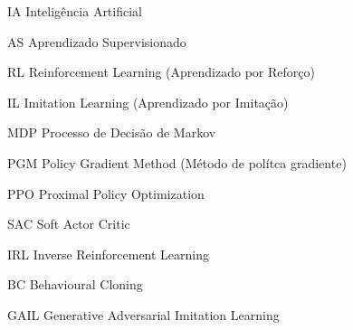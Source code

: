 \documentclass[
	12pt,					%
	openright,				%
	twoside,					%
	a4paper,					%
	english,					%
	brazil					%
	]{abntex2}
\begin{document}
\frenchspacing

\pretextual



\imprimirfolhaderosto*

% 

% 

% 



% 



\listoffigures*
\cleardoublepage

\listoftables*
\cleardoublepage

\begin{siglas}
  \item[IA] Inteligência Artificial
  \item[AS] Aprendizado Supervisionado
  \item[RL]  Reinforcement Learning (Aprendizado por Reforço)
  \item[IL]  Imitation Learning (Aprendizado por Imitação)
  \item[MDP] Processo de Decisão de Markov
  \item[PGM] Policy Gradient Method (Método de polítca gradiente)
  \item[PPO] Proximal Policy Optimization
  \item[SAC] Soft Actor Critic
  \item[IRL] Inverse Reinforcement Learning
  \item[BC]  Behavioural Cloning
  \item[GAIL] Generative Adversarial Imitation Learning
\end{siglas}
\end{document}
